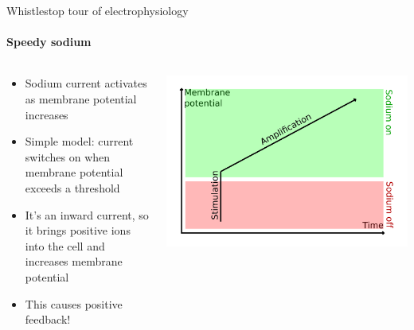 \documentclass[aspectratio=169]{beamer}
\begin{document}
\begin{frame}[label={sec:orgf6c6c5b}]{Whistlestop tour of electrophysiology}
\framesubtitle{Speedy sodium}

\begin{columns}
\begin{column}{0.6\columnwidth}
\begin{itemize}
\item Sodium current activates as membrane potential increases
\item Simple model: current switches on when membrane potential exceeds a threshold
\item It's an inward current, so it brings positive ions into the cell and increases membrane potential
\item This causes positive feedback!
\end{itemize}
\end{column}

\begin{column}{0.4\columnwidth}
\begin{center}
\includegraphics[width=.9\linewidth]{./fastsodium.png}
\end{center}
\end{column}
\end{columns}
\end{frame}
\end{document}
